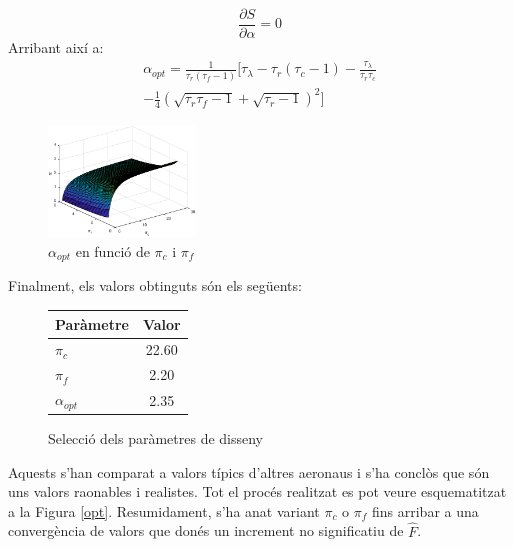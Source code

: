 \begin{equation*}
	\frac{\partial S}{\partial \alpha} = 0 
\end{equation*}
Arribant així a:
\begin{multline}
	\alpha_{opt} = \frac{1}{\tau_r(\tau_f-1)}\bigg[\tau_{\lambda}-\tau_r(\tau_c-1)-\frac{\tau_{\lambda}}{\tau_r\tau_c} \\ -\frac{1}{4}(\sqrt{\tau_r\tau_f-1} + \sqrt{\tau_r-1})^2\bigg]
\end{multline}
\begin{figure}[H]
	\centering
	\includegraphics[width=0.35\textwidth]{./pics/alpha_pc_pf}
	\caption{$\alpha_{opt}$ en funció de $\pi_c$ i $\pi_f$}
\end{figure}
Finalment, els valors obtinguts són els següents:
\begin{figure}[H]
	\centering
	\begin{tabular}{lc}
		\toprule[3pt]
		\textbf{Paràmetre}&\textbf{Valor}\\
		\midrule[1pt]
		$\pi_{c}$ & 22.60 \\
		$\pi_{f}$ & 2.20 \\
		$\alpha_{opt}$ & 2.35 \\
		\bottomrule[2pt]
	\end{tabular}
	\label{C_opti2}
	\caption{Selecció dels paràmetres de disseny}
\end{figure}
\noindent Aquests s'han comparat a valors típics d'altres aeronaus i s'ha conclòs que són uns valors raonables i realistes. Tot el procés realitzat es pot veure esquematitzat a la Figura \ref{opt}.
Resumidament, s'ha anat variant $\pi_c$ o $\pi_f$ fins arribar a una convergència de valors que donés un increment no significatiu de $\hat{F}$. 
